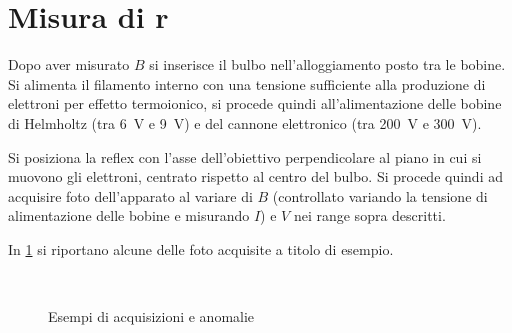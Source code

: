 \section{Misura di \textbf{r}}

Dopo aver misurato $B$ si inserisce il bulbo nell'alloggiamento posto tra le bobine.
Si alimenta il filamento interno con una tensione sufficiente alla produzione di elettroni per effetto termoionico, si procede quindi all'alimentazione delle bobine di Helmholtz (tra \SI{6}{\volt} e \SI{9}{\volt}) e del cannone elettronico (tra \SI{200}{\volt} e \SI{300}{\volt}).
	

Si posiziona la reflex con l'asse dell'obiettivo perpendicolare al piano in cui si muovono gli elettroni, centrato rispetto al centro del bulbo.
Si procede quindi ad acquisire foto dell'apparato al variare di $B$ (controllato variando la tensione di alimentazione delle bobine e misurando $I$) e $V$ nei range sopra descritti.

In \figurename{ \ref{f:acquisizione}} si riportano alcune delle foto acquisite a titolo di esempio.
		
		\begin{figure}[H]
		\centering
		\\
		\caption{Esempi di acquisizioni e anomalie}
		\label{f:acquisizione}
	\end{figure}


